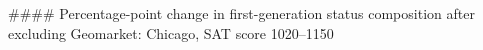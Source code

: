 #### Percentage-point change in first-generation status composition after excluding Geomarket: Chicago, SAT score 1020–1150
